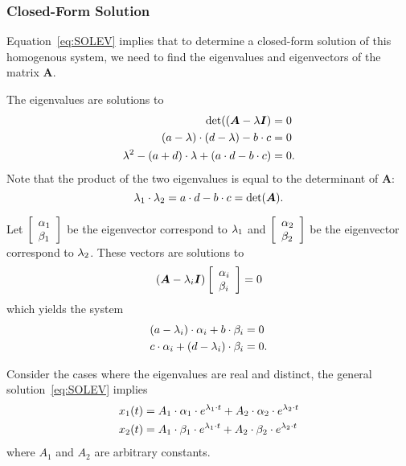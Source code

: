 \documentclass[letterpaper,12pt,leqno]{article}
\begin{document}
\subsubsection{Closed-Form Solution}
Equation~\eqref{eq:SOLEV} implies that to determine a closed-form solution of this homogenous system, we need to find the eigenvalues and eigenvectors of the matrix $\bm{A}$.

The eigenvalues are solutions to 
\begin{align*}
\det( \left( \bm{A}-\lambda \bm{I} \right) &=0\\
\left( a-\lambda \right) \cdot \left( d-\lambda \right) -b\cdot c &=0 \\
\lambda ^{2}-\left( a+d \right)\cdot  \lambda +\left( a\cdot d-b\cdot c \right) &=0.
\end{align*}
Note that the product of the two eigenvalues is equal to the determinant of $
\bm{A}$:
\begin{equation}
\lambda_{1}\cdot \lambda_{2}=a\cdot d-b\cdot c=\det(\bm{A}).\label{eq:DETL}
\end{equation}

Let $\left[ 
\begin{array}{l}
\alpha_{1} \\ 
\beta_{1}
\end{array}
 \right] $ be the eigenvector correspond to $\lambda_{1}$ and $\left[ 
\begin{array}{l}
\alpha_{2} \\ 
\beta_{2}
\end{array} \right] $ be the eigenvector correspond to $\lambda_{2}$. These vectors are solutions to 
\begin{equation*}
\left( \bm{A}-\lambda_{i}\bm{I} \right) \left[ 
\begin{array}{l}
\alpha_{i} \\ 
\beta_{i}
\end{array} \right] =0
\end{equation*}
which yields the system
\begin{align*}
\left( a-\lambda_{i} \right)\cdot  \alpha_{i}+b\cdot \beta _{i} &=0 \\
c\cdot \alpha_{i}+\left( d-\lambda_{i} \right)\cdot  \beta _{i} &=0.
\end{align*}

Consider the cases where the eigenvalues are real and distinct, the general
solution~\eqref{eq:SOLEV} implies
\begin{align*}
x_{1}(t) &=A_{1}\cdot \alpha_{1}\cdot e^{\lambda_{1}\cdot t}+A_{2}\cdot \alpha_{2}\cdot e^{\lambda_{2}\cdot t}\\
x_{2}(t) &=A_{1}\cdot \beta_{1}\cdot e^{\lambda_{1}\cdot t}+A_{2}\cdot \beta_{2}\cdot e^{\lambda_{2}\cdot t} 
\end{align*}
where $A_{1}$ and $A_{2}$ are arbitrary constants. 
\end{document}
